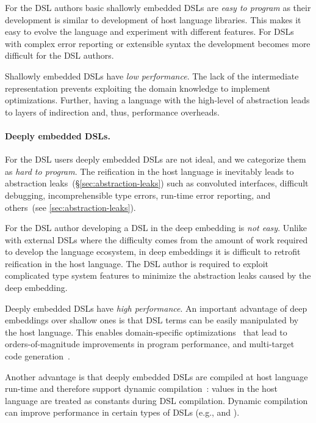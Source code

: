 For the DSL authors basic shallowly embedded DSLs are \emph{easy to program} as their
 development is similar to development of host language libraries. This makes it easy
 to evolve the language and experiment with different features. For DSLs
 with complex error reporting or extensible syntax the development
 becomes more difficult for the DSL authors.

Shallowly embedded DSLs have \emph{low performance}. The lack of the intermediate representation
prevents exploiting the domain knowledge to implement optimizations. Further, having
a language with the high-level of abstraction leads to layers of indirection and, thus,
performance overheads. %

\paragraph{Deeply embedded DSLs.} For the DSL users deeply embedded DSLs are not ideal,
 and we categorize them as \emph{hard to program}. The reification in the host language
 is inevitably leads to abstraction leaks~(\S \ref{sec:abstraction-leaks}) such as
 convoluted interfaces, difficult debugging, incomprehensible type errors, run-time error reporting,
 and others~(see \ref{sec:abstraction-leaks}).

For the DSL author developing a DSL in the deep embedding is \emph{not easy}. Unlike with
 external DSLs where the difficulty comes from the amount of work required to develop
 the language ecosystem, in deep embeddings it is difficult to retrofit reification in the host language.
 The DSL author is required to exploit complicated type system features to
 minimize the abstraction leaks caused by the deep embedding.

Deeply embedded DSLs have \emph{high performance}. An important advantage of deep embeddings over shallow ones is that DSL
  terms can be easily manipulated by the host language. This enables domain-specific
  optimizations~\cite{rompf_lightweight_2012,rompf_optimizing_2013}
  that lead to orders-of-magnitude improvements in program performance, and
  multi-target code generation~\cite{brown_heterogeneous_2011}.

Another advantage is that deeply embedded DSLs are compiled at host language run-time and therefore
 support dynamic compilation~: values in the host language are treated as constants during DSL compilation. Dynamic compilation can improve performance in certain types of DSLs (e.g.,  and ).


